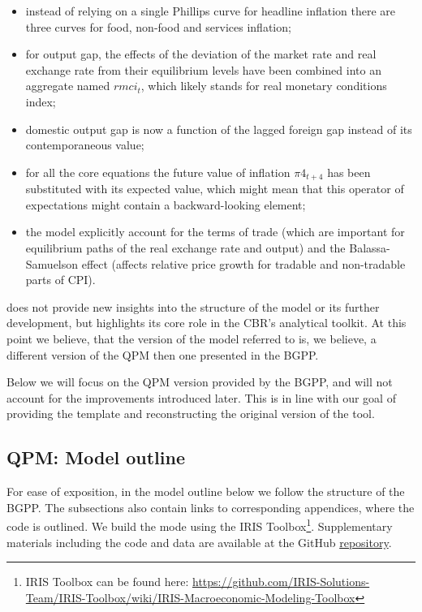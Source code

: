 \documentclass[12pt]{article}
\begin{document}
\begin{itemize}
    \item instead of relying on a single Phillips curve for headline inflation there are three curves for food, non-food and services inflation;
    \item for output gap, the effects of the deviation of the market rate and real exchange rate from their equilibrium levels have been combined into an aggregate named $rmci_t$, which likely stands for real monetary conditions index;
    \item domestic output gap is now a function of the lagged foreign gap instead of its contemporaneous value;
    \item for all the core equations the future value of inflation $\pi{4}_{t+4}$ has been substituted with its expected value, which might mean that this operator of expectations might contain a backward-looking element; 
    \item the model explicitly account for the terms of trade (which are important for equilibrium paths of the real exchange rate and output) and the Balassa-Samuelson effect (affects relative price growth for tradable and non-tradable parts of CPI).
\end{itemize}

\cite{bankofrussiampr201501} does not provide new insights into the structure of the model or its further development, but highlights its core role in the CBR's analytical toolkit. At this point we believe, that the version of the model referred to is, we believe, a different version of the QPM then one presented in the BGPP.

Below we will focus on the QPM version provided by the BGPP, and will not account for the improvements introduced later. This is in line with our goal of providing the template and reconstructing the original version of the tool. 

\subsection{QPM: Model outline}
\label{ssec:equqpm}

For ease of exposition, in the model outline below we follow the structure of the BGPP. The subsections also contain links to corresponding appendices, where the code is outlined. We build the mode using the IRIS Toolbox\footnote{IRIS Toolbox can be found here: \href{https://github.com/IRIS-Solutions-Team/IRIS-Toolbox/wiki/IRIS-Macroeconomic-Modeling-Toolbox}{https://github.com/IRIS-Solutions-Team/IRIS-Toolbox/wiki/IRIS-Macroeconomic-Modeling-Toolbox}}. Supplementary materials including the code and data are available at the GitHub \href{https://github.com/alexisakov/replica}{repository}.
\end{document}
